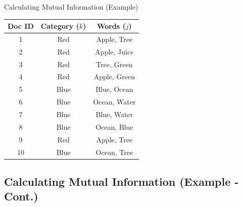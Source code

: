 \documentclass[
  ignorenonframetext,
  aspectratio=169]{beamer}
\begin{document}
\begin{frame}{Calculating Mutual Information (Example)}
\label{calculating-mutual-information-example}
\begin{table}[h!]
\centering
\footnotesize
\begin{tabular}{ccc}
\toprule
\textbf{Doc ID} & \textbf{Category ($k$)} & \textbf{Words ($j$)} \\ 
\midrule
 1 & Red & Apple, Tree   \\ 
 2 & Red & Apple, Juice  \\ 
 3 & Red & Tree, Green  \\ 
 4 & Red & Apple, Green  \\ 
 5 & Blue & Blue, Ocean  \\ 
 6 & Blue & Ocean, Water  \\ 
 7 & Blue & Blue, Water  \\ 
 8 & Blue & Ocean, Blue  \\ 
 9 & Red & Apple, Tree  \\ 
 10 & Blue & Ocean, Tree  \\ 
\bottomrule
\end{tabular}
\end{table}
\end{frame}

\subsection{Calculating Mutual Information (Example -
Cont.)}\label{calculating-mutual-information-example---cont.}
\end{document}
